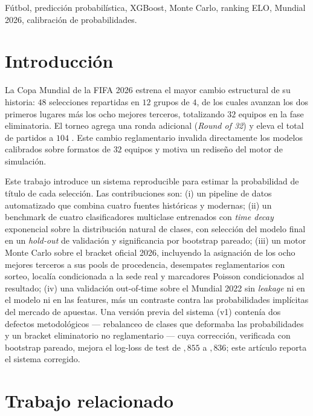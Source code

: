 \documentclass[conference]{IEEEtran}
\begin{document}
\begin{IEEEkeywords}
  F\'utbol, predicci\'on probabil\'istica, XGBoost, Monte Carlo,
  ranking ELO, Mundial 2026, calibraci\'on de probabilidades.
\end{IEEEkeywords}

\section{Introducci\'on}
\label{sec:intro}

La Copa Mundial de la FIFA 2026 estrena el mayor cambio estructural de
su historia: $48$ selecciones repartidas en $12$ grupos de $4$, de los
cuales avanzan los dos primeros lugares m\'as los ocho mejores terceros,
totalizando $32$ equipos en la fase eliminatoria. El torneo agrega una
ronda adicional (\textit{Round of 32}) y eleva el total de partidos a
$104$ \cite{fifa2026}. Este cambio reglamentario invalida directamente
los modelos calibrados sobre formatos de $32$ equipos y motiva un
rediseño del motor de simulaci\'on.

Este trabajo introduce un sistema reproducible para estimar la
probabilidad de t\'itulo de cada selecci\'on. Las contribuciones son:
(i) un pipeline de datos automatizado que combina cuatro fuentes
hist\'oricas y modernas; (ii) un benchmark de cuatro clasificadores
multiclase entrenados con \emph{time decay} exponencial sobre la
distribuci\'on natural de clases, con selecci\'on del modelo final en un
\emph{hold-out} de validaci\'on y significancia por bootstrap pareado;
(iii) un motor Monte Carlo sobre el bracket oficial 2026, incluyendo la
asignaci\'on de los ocho mejores terceros a sus pools de procedencia,
desempates reglamentarios con sorteo, localía condicionada a la sede real
y marcadores Poisson condicionados al resultado; (iv) una validaci\'on
out-of-time sobre el Mundial 2022 sin \emph{leakage} ni en el modelo ni
en las features, m\'as un contraste contra las probabilidades impl\'icitas
del mercado de apuestas. Una versi\'on previa del sistema (v1) conten\'ia
dos defectos metodol\'ogicos --- rebalanceo de clases que deformaba las
probabilidades y un bracket eliminatorio no reglamentario --- cuya
correcci\'on, verificada con bootstrap pareado, mejora el log-loss de
test de ${,}855$ a ${,}836$; este art\'iculo reporta el sistema corregido.

\section{Trabajo relacionado}
\label{sec:related}
\end{document}
